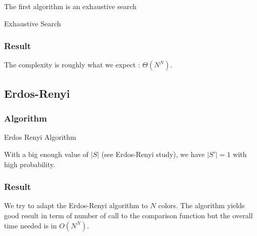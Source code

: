 \documentclass[12pt]{article}
\theoremstyle{definition}
\theoremstyle{plain}
\theoremstyle{remark}
\begin{document}
The first algorithm is an exhaustive search

\begin{algorithm}[H]
	\caption{Exhaustive Search}
\end{algorithm}

\subsubsection{Result}


The complexity is roughly what we expect : $\Theta(N^N)$.

\subsection{Erdos-Renyi}

\subsubsection{Algorithm}
\begin{algorithm}[H]
	\caption{Erdos Renyi Algorithm}
\end{algorithm}

With a big enough value of $|S|$ (see Erdos-Renyi study), we have $|S'| = 1$ with high probability.

\subsubsection{Result}


We try to adapt the Erdos-Renyi algorithm to $N$ colors.
The algorithm yields good result in term of number of call to the comparison function but the overall time needed is in $O(N^N)$.
\end{document}
